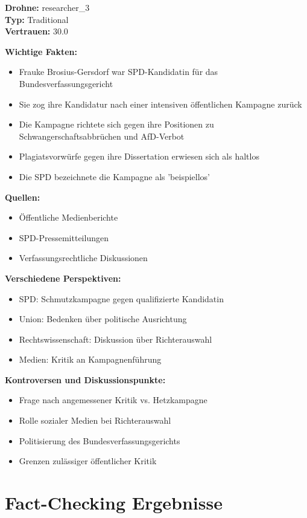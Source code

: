 \documentclass[12pt,a4paper]{article}
\begin{document}
\textbf{Drohne:} researcher\_3\\
\textbf{Typ:} Traditional\\
\textbf{Vertrauen:} 30.0%

\textbf{Wichtige Fakten:}
\begin{itemize}
\item Frauke Brosius-Gersdorf war SPD-Kandidatin für das Bundesverfassungsgericht
\item Sie zog ihre Kandidatur nach einer intensiven öffentlichen Kampagne zurück
\item Die Kampagne richtete sich gegen ihre Positionen zu Schwangerschaftsabbrüchen und AfD-Verbot
\item Plagiatsvorwürfe gegen ihre Dissertation erwiesen sich als haltlos
\item Die SPD bezeichnete die Kampagne als 'beispiellos'
\end{itemize}

\textbf{Quellen:}
\begin{itemize}
\item Öffentliche Medienberichte
\item SPD-Pressemitteilungen
\item Verfassungsrechtliche Diskussionen
\end{itemize}

\textbf{Verschiedene Perspektiven:}
\begin{itemize}
\item SPD: Schmutzkampagne gegen qualifizierte Kandidatin
\item Union: Bedenken über politische Ausrichtung
\item Rechtswissenschaft: Diskussion über Richterauswahl
\item Medien: Kritik an Kampagnenführung
\end{itemize}

\textbf{Kontroversen und Diskussionspunkte:}
\begin{itemize}
\item Frage nach angemessener Kritik vs. Hetzkampagne
\item Rolle sozialer Medien bei Richterauswahl
\item Politisierung des Bundesverfassungsgerichts
\item Grenzen zulässiger öffentlicher Kritik
\end{itemize}


\newpage
\section{Fact-Checking Ergebnisse}
\end{document}
